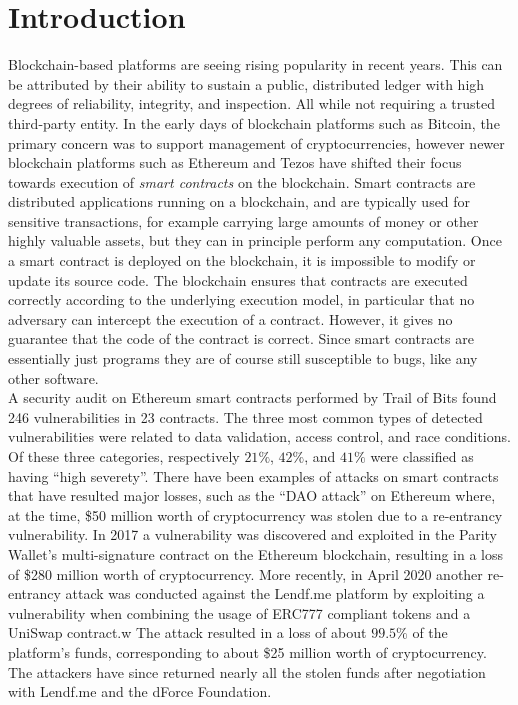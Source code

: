 \documentclass[twoside,11pt,openright]{report}
\begin{document}
\setcounter{tocdepth}{1}
\tableofcontents
{}
\setcounter{secnumdepth}{2}


\chapter{Introduction}
\label{ch:intro}
Blockchain-based platforms are seeing rising popularity in recent years. This can be attributed by their ability to sustain a public, distributed ledger with high degrees of reliability, integrity, and inspection. All while not requiring a trusted third-party entity. In the early days of blockchain platforms such as Bitcoin, the primary concern was to support management of cryptocurrencies, however newer blockchain platforms such as Ethereum and Tezos have shifted their focus towards execution of \textit{smart contracts} on the blockchain.
Smart contracts are distributed applications running on a blockchain, and are typically used for sensitive transactions, for example carrying large amounts of money or other highly valuable assets, but they can in principle perform any computation. Once a smart contract is deployed on the blockchain, it is impossible to modify or update its source code. The blockchain ensures that contracts are executed correctly according to the underlying execution model, in particular that no adversary can intercept the execution of a contract. However, it gives no guarantee that the code of the contract is correct. Since smart contracts are essentially just programs they are of course still susceptible to bugs, like any other software. \medskip\\
A security audit on Ethereum smart contracts performed by Trail of Bits found 246 vulnerabilities in 23 contracts\cite{groce2019actual}. The three most common types of detected vulnerabilities were related to data validation, access control, and race conditions. Of these three categories, respectively $21\%$, $42\%$, and $41\%$ were classified as having ``high severety''.
There have been examples of attacks on smart contracts that have resulted major losses, such as the ``DAO attack'' on Ethereum where, at the time, \$50 million worth of cryptocurrency was stolen due to a re-entrancy vulnerability\cite{daoattack}. In 2017 a vulnerability was discovered and exploited in the Parity Wallet's multi-signature contract on the Ethereum blockchain, resulting in a loss of \$280 million worth of cryptocurrency\cite{multisighack}. More recently, in April 2020 another re-entrancy attack was conducted against the Lendf.me platform by exploiting a vulnerability when combining the usage of ERC777 compliant tokens and a UniSwap contract\cite{uniswap-exploit}.w
The attack resulted in a loss of about $99.5\%$ of the platform's funds, corresponding to about \$25 million worth of cryptocurrency. The attackers have since returned nearly all the stolen funds after negotiation with Lendf.me and the dForce Foundation.
\end{document}
